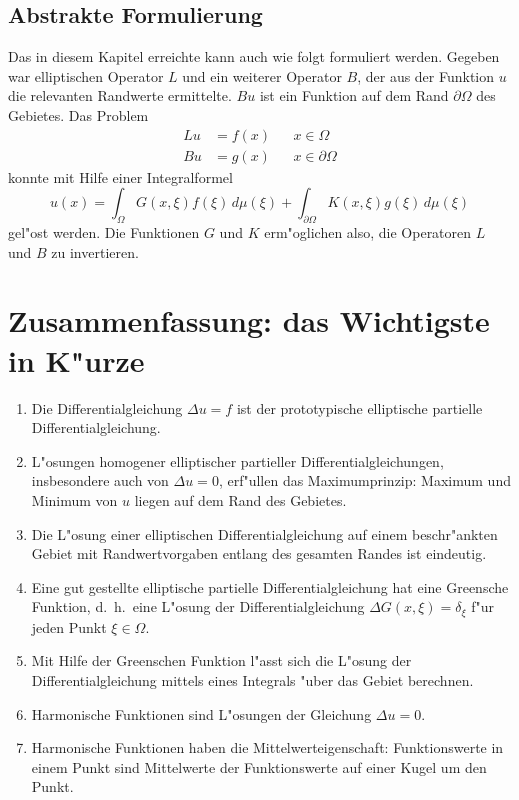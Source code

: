 \subsection{Abstrakte Formulierung}
Das in diesem Kapitel erreichte kann auch wie folgt formuliert werden.
Gegeben war elliptischen Operator $L$ und ein weiterer Operator $B$,
der aus der Funktion $u$ die relevanten Randwerte ermittelte. $Bu$
ist ein Funktion auf dem Rand $\partial \Omega$ des Gebietes. 
Das Problem
\begin{align*}
Lu&=f(x)&&x\in\Omega
\\
Bu&=g(x)&&x\in\partial\Omega
\end{align*}
konnte mit Hilfe einer Integralformel
\[
u(x)=\int_\Omega G(x,\xi)f(\xi)\,d\mu(\xi)+\int_{\partial \Omega}K(x,\xi)g(\xi)\,d\mu(\xi)
\]
gel"ost werden.
Die Funktionen $G$ und $K$ erm"oglichen also, die Operatoren $L$ und $B$
zu invertieren.

\section{Zusammenfassung: das Wichtigste in K"urze}
\begin{enumerate}
\item Die Differentialgleichung $\Delta u=f$ ist der prototypische
elliptische partielle Differentialgleichung.
\item L"osungen homogener elliptischer partieller Differentialgleichungen,
insbesondere auch von $\Delta u=0$, erf"ullen das Maximumprinzip:
Maximum und Minimum von $u$ liegen auf dem Rand des Gebietes.
\item Die L"osung einer elliptischen Differentialgleichung auf einem
beschr"ankten Gebiet mit Randwertvorgaben entlang des gesamten Randes
ist eindeutig.
\item Eine gut gestellte elliptische partielle Differentialgleichung hat
eine Greensche Funktion, d.~h.~eine L"osung der Differentialgleichung
$\Delta G(x,\xi)=\delta_\xi$ f"ur jeden Punkt $\xi\in\Omega$.
\item Mit Hilfe der Greenschen Funktion l"asst sich die L"osung
der Differentialgleichung mittels eines Integrals "uber das Gebiet
berechnen.
\item Harmonische Funktionen sind L"osungen der Gleichung $\Delta u=0$.
\item Harmonische Funktionen haben die Mittelwerteigenschaft: Funktionswerte
in einem Punkt sind Mittelwerte der Funktionswerte auf einer Kugel
um den Punkt.
\end{enumerate}


